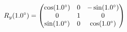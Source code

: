 \documentclass[preview]{standalone}
\begin{document}
\begin{align*}
\special{dvisvgm:raw <g id='unique000'>}R_y(1.0^\circ) = \begin{pmatrix} \cos(1.0^\circ) & 0 & -\sin(1.0^\circ) \\ 0 & 1 & 0 \\ \sin(1.0^\circ) & 0 & \cos(1.0^\circ) \end{pmatrix}\special{dvisvgm:raw </g>}
\end{align*}
\end{document}
